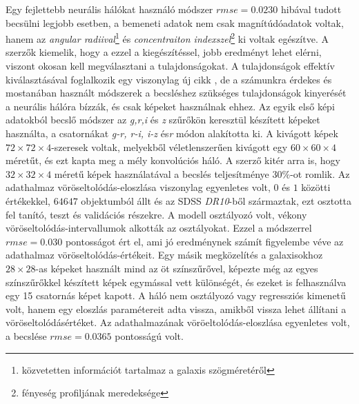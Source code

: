 \documentclass[12pt,letterpaper,twoside,openright]{book}
\begin{document}
 \newline \indent
 Egy fejlettebb neurális hálókat használó módszer \cite{mlrsone} $\textit{rmse} = 0.0230$ hibával tudott becsülni legjobb esetben, a bemeneti adatok nem csak magnítúdóadatok voltak, hanem az \textit{angular radiival}\footnote{közvetetten információt tartalmaz a galaxis szögméretéről} és \textit{concentraiton indexszel}\footnote{fényeség profiljának meredeksége} ki voltak egészítve. A szerzők kiemelik, hogy a ezzel a kiegészítéssel, jobb eredményt lehet elérni, viszont okosan kell megválasztani a tulajdonságokat. A tulajdonságok effektív kiválasztásával foglalkozik egy viszonylag új cikk \cite{fes}, de a számunkra érdekes és mostanában használt módszerek a becsléshez szükséges tulajdonságok kinyerését a neurális hálóra bízzák, és csak képeket használnak ehhez. 
 \newline \indent
 Az egyik első képi adatokból becslő módszer \cite{benh} az \textit{g,r,i} és \textit{z} szűrőkön keresztül készített képeket használta, a csatornákat \textit{g-r, r-i, i-z }és\textit{r} módon alakította ki. A kivágott képek $72\times 72\times 4$-szeresek voltak, melyekből véletlenszerűen kivágott egy $60\times 60 \times 4$ méretűt, és ezt kapta meg a mély konvolúciós háló. A szerző kitér arra is, hogy $32\times32\times 4$ méretű képek használatával a becslés teljesítménye $30\%$-ot romlik. Az adathalmaz vöröseltolódás-eloszlása viszonylag egyenletes volt, $0$ és $1$ közötti értékekkel, $64647$ objektumból állt és az SDSS \textit{DR10}-ből származtak, ezt osztotta fel tanító, teszt és validációs részekre. A modell osztályozó volt, vékony vöröseltolódás-intervallumok alkották az osztályokat. Ezzel a módszerrel  $\textit{rmse} = 0.030$ pontosságot ért el, ami jó eredménynek számít figyelembe véve az adathalmaz vöröseltolódás-értékeit.
 \newline\indent
 Egy másik megközelítés \cite{dast} a galaxisokhoz $28\times 28$-as képeket használt mind az öt színszűrővel, képezte még az egyes színszűrőkkel készített képek egymással vett különségét, és ezeket is felhasználva egy 15 csatornás képet kapott. A háló nem osztályozó vagy regressziós kimenetű volt, hanem egy eloszlás paramétereit adta vissza, amikből vissza lehet állítani a vöröseltolódásértéket. Az adathalmazának vöröeltolódás-eloszlása egyenletes volt, a becslése $\textit{rmse} =0.0365$ pontosságú volt. 
 \newline\indent
 
 
 
 
 
 
 
\end{document}
